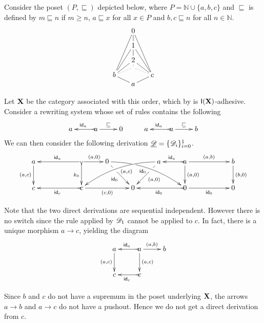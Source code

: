 \begin{example}\label{ex:diff1}
	Consider the poset $(P, \sqsubseteq)$ depicted below, where
	$P = \mathbb{N} \cup \{a,b,c\}$ and $\sqsubseteq$ is defined by
	$m \sqsubseteq n$ if $m \geq n$, $a \sqsubseteq x$ for all $x \in P$
	and $b, c \sqsubseteq n$ for all $n \in \mathbb{N}$.
	\[\xymatrix@C=16pt@R=1pt{
		& 0 \ar@{-}[dd] \ar@{-}[ddddddl] \ar@{-}[ddddddr] &  \\
		&  & \\
		& 1 \ar@{-}[dd] \ar@{-}[ddddl]  \ar@{-}[ddddr]   &  \\
		&  & \\
		& 2 \ar@{.}[d] \ar@{-}[ddl]   \ar@{-}[ddr]     &  \\
		&  \ar@{.}[dl]   \ar@{.}[dr] & \\
		b \ar@{-}[dr] & & c \ar@{-}[dl]\\
		& a} \]
		
	Let $\textbf {\textup{X}}$ be the  
	category associated with this order, which by  is
	$\mathsf{I(\textbf {\textup{X}})}$-adhesive. Consider a rewriting
	system whose set of rules contains the following 
	\[\xymatrix{a & a \ar[r]^{\sqsubseteq} \ar@{>->}[l]_{\id{a}} & 0 & a & a
		\ar[r]^{\sqsubseteq} \ar@{>->}[l]_{\id{a}} & b }\]
	We can then consider the  following derivation
	$\underline{\mathscr{D}}=\{\mathscr{D}_i\}_{i=0}^1$.
	 \[
   \xymatrix@C=25pt{a \ar[d]_{(a,c)}&& \ar@{>->}[d]_{k_0}\ar[ll]_{\id{a}}
		    \ar[r]^{(a,0)} & 0 \ar@/^.35cm/[drrr]|(.315)\hole_(.45){\id{0}}
		    \ar[dr]|(.3)\hole_{\id{0}} && a \ar@/_.35cm/[dlll]^(.45){\hspace{5pt}(a,c)}
		     \ar[dl]|(.3)\hole^{(a,0)}& a \ar[d]^{(a,0)}\ar@{>->}[l]_{\id{a}}
		     \ar[rr]^{(a,b)} && b \ar[d]^{(b,0)}\\c &&
		     \ar@{>->}[ll]^{\id{c}} c \ar[rr]_{(c,0)}&& 0 &&
		     \ar@{>->}[ll]^{\id{0}} 0 \ar[rr]_{\id{0}}&& 0}\]

	Note that the two direct derivations are sequential
	independent. However there is no switch since the rule applied by
	$\mathscr{D}_1$ cannot be applied to $c$. In fact, there is a unique morphism
	$a\to c$, yielding the diagram
	\[	\xymatrix{a \ar[d]_{(a,c)}& a
		\ar[d]^{(a,c)}\ar@{>->}[l]_{\id{a}} \ar[r]^{(a,b)}& b \\c & c
		\ar@{>->}[l]^{\id{c}}
	}\]
	
	Since $b$ and $c$ do not have a supremum in the poset underlying $\textbf {\textup{X}}$, the arrows
	$a\to b$ and $a\to c$ do not have a pushout. Hence we do not get a direct derivation from $c$.
\end{example}



